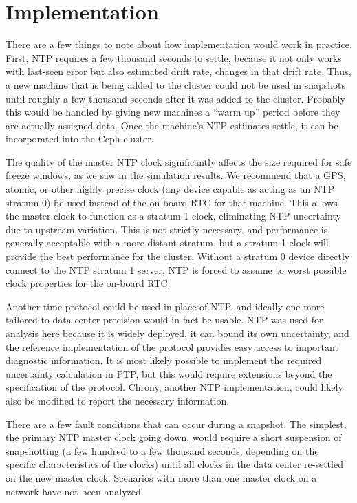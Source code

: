 \chapter{Implementation}
\label{sec:impl}

There are a few things to note about how implementation would work in
practice. First, NTP requires a few thousand seconds to settle,
because it not only works with last-seen error but also estimated
drift rate, changes in that drift rate. Thus, a new machine that is
being added to the cluster could not be used in snapshots until
roughly a few thousand seconds after it was added to the
cluster. Probably this would be handled by giving new machines a “warm
up” period before they are actually assigned data. Once the machine’s
NTP estimates settle, it can be incorporated into the Ceph cluster.

The quality of the master NTP clock significantly affects the size
required for safe freeze windows, as we saw in the simulation
results. We recommend that a GPS, atomic, or other highly precise
clock (any device capable as acting as an NTP stratum 0) be used
instead of the on-board RTC for that machine. This allows the master
clock to function as a stratum 1 clock, eliminating NTP uncertainty
due to upstream variation. This is not strictly necessary, and
performance is generally acceptable with a more distant stratum, but a
stratum 1 clock will provide the best performance for the
cluster. Without a stratum 0 device directly connect to the NTP
stratum 1 server, NTP is forced to assume to worst possible clock
properties for the on-board RTC.

Another time protocol could be used in place of NTP, and ideally one
more tailored to data center precision would in fact be usable. NTP
was used for analysis here because it is widely deployed, it can bound
its own uncertainty, and the reference implementation of the protocol
provides easy access to important diagnostic information. It is most
likely possible to implement the required uncertainty calculation in
PTP, but this would require extensions beyond the specification of the
protocol. Chrony, another NTP implementation, could likely also be
modified to report the necessary information.

There are a few fault conditions that can occur during a snapshot. The
simplest, the primary NTP master clock going down, would require a
short suspension of snapshotting (a few hundred to a few thousand
seconds, depending on the specific characteristics of the clocks)
until all clocks in the data center re-settled on the new master
clock. Scenarios with more than one master clock on a network have not
been analyzed.

